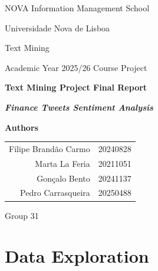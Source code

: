 \documentclass[11pt,a4paper]{article}
\begin{document}

\begin{titlepage}
\centering
\thispagestyle{empty}

{\sffamily\large NOVA Information Management School\par}
{\sffamily\normalsize Universidade Nova de Lisboa\par}

\vspace{1.5cm}
\vspace{2cm}

{\sffamily\large Text Mining\par}
{\sffamily\normalsize Academic Year 2025/26 \textbar{} Course Project\par}

\vfill

{\sffamily\Huge\bfseries Text Mining Project Final Report\par}
\vspace{0.4em}
{\sffamily\Huge\bfseries\itshape Finance Tweets Sentiment Analysis\par}
\vspace{0.4em}

\vfill

{\sffamily\large\bfseries Authors\par}
\vspace{0.4em}
\begin{tabular}{rl}
  Filipe Brand\~ao Carmo & 20240828 \\
  Marta La Feria         & 20211051 \\
  Gon\c{c}alo Bento      & 20241137 \\
  Pedro Carrasqueira     & 20250488 \\
\end{tabular}

\vspace{0.8cm}
{\sffamily Group 31\par}
\vspace{0.4em}

\vfill
\end{titlepage}

\setcounter{page}{1}

\tableofcontents
\newpage

\section{Data Exploration}
\end{document}

